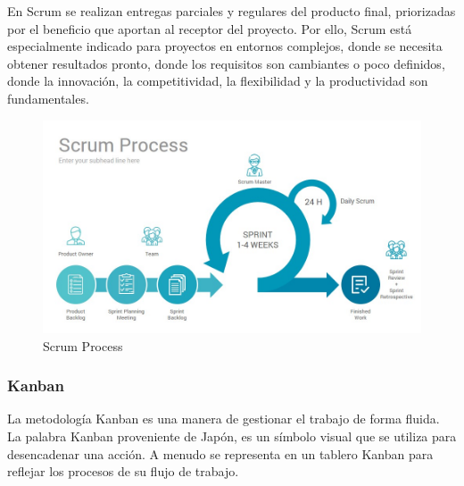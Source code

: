 \documentclass[a4paper,11pt]{book}
\begin{document}
En Scrum se realizan entregas parciales y regulares del producto final, priorizadas por el beneficio que aportan al receptor del proyecto. Por ello, Scrum está especialmente indicado para proyectos en entornos complejos, donde se necesita obtener resultados pronto, donde los requisitos son cambiantes o poco definidos, donde la innovación, la competitividad, la flexibilidad y la productividad son fundamentales.

\begin{figure}[H]  
\centering 
\includegraphics[scale=0.35]{imagenes/scrum.jpg}
\caption{ Scrum Process\cite{scrum} }  
\end{figure}


\subsubsection{Kanban}

La metodología Kanban es una manera de gestionar el trabajo de forma fluida. La palabra Kanban proveniente de Japón, es un símbolo visual que se utiliza para desencadenar una acción. A menudo se representa en un tablero Kanban para reflejar los procesos de su flujo de trabajo.
\end{document}
